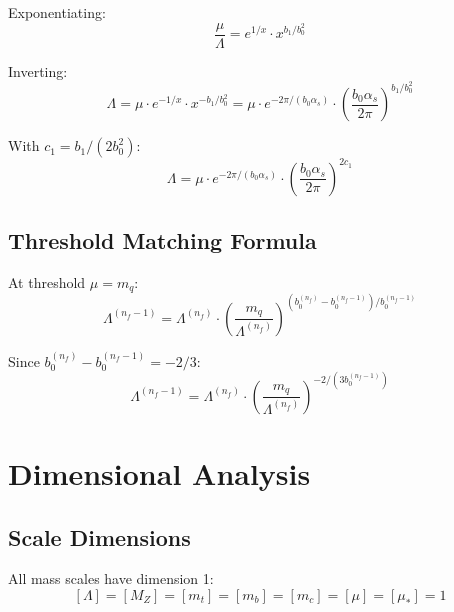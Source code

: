 \documentclass[11pt,a4paper]{article}
\theoremstyle{definition}
\begin{document}
Exponentiating:
\begin{equation}
\label{eq:app-2loop-exp}
\frac{\mu}{\Lambda} = e^{1/x} \cdot x^{b_1/b_0^2}
\end{equation}

Inverting:
\begin{equation}
\label{eq:app-2loop-lambda}
\Lambda = \mu \cdot e^{-1/x} \cdot x^{-b_1/b_0^2}
  = \mu \cdot e^{-2\pi/(b_0\alpha_s)} \cdot \left(\frac{b_0\alpha_s}{2\pi}\right)^{b_1/b_0^2}
\end{equation}

With $c_1 = b_1/(2b_0^2)$:
\begin{equation}
\label{eq:app-2loop-final}
\Lambda = \mu \cdot e^{-2\pi/(b_0\alpha_s)} \cdot \left(\frac{b_0\alpha_s}{2\pi}\right)^{2c_1}
\end{equation}

\subsection{Threshold Matching Formula}
\label{subsec:thresh-match-formula}

At threshold $\mu = m_q$:
\begin{equation}
\label{eq:app-thresh-match}
\Lambda^{(n_f-1)} = \Lambda^{(n_f)} \cdot
  \left(\frac{m_q}{\Lambda^{(n_f)}}\right)^{(b_0^{(n_f)} - b_0^{(n_f-1)})/b_0^{(n_f-1)}}
\end{equation}

Since $b_0^{(n_f)} - b_0^{(n_f-1)} = -2/3$:
\begin{equation}
\label{eq:app-thresh-match-2}
\Lambda^{(n_f-1)} = \Lambda^{(n_f)} \cdot
  \left(\frac{m_q}{\Lambda^{(n_f)}}\right)^{-2/(3b_0^{(n_f-1)})}
\end{equation}

\section{Dimensional Analysis}
\label{app:dim}

\subsection{Scale Dimensions}
\label{subsec:app-dim-scales}

All mass scales have dimension 1:
\begin{equation}
\label{eq:app-dim-scales}
[\Lambda] = [M_Z] = [m_t] = [m_b] = [m_c] = [\mu] = [\mu_*] = 1
\end{equation}
\end{document}
